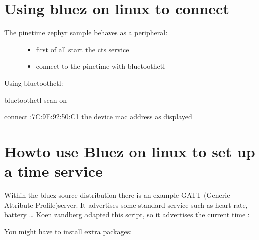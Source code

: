 \documentclass[letterpaper,10pt,english]{sphinxmanual}
\begin{document}
\section{Using bluez on linux to connect}
\label{\detokenize{current-time:using-bluez-on-linux-to-connect}}\begin{description}
\item[{The pinetime zephyr sample behaves as a peripheral:}] \leavevmode\begin{itemize}
\item {} 
first of all start the cts service

\item {} 
connect to the pinetime with bluetoothctl

\end{itemize}

\end{description}

Using bluetoothctl:

\begin{sphinxVerbatim}[commandchars=\\\{\}]
bluetoothctl
scan on


connect :7C:9E:92:50:C1 the device mac address as displayed
\end{sphinxVerbatim}


\section{Howto use Bluez on linux to set up a time service}
\label{\detokenize{current-time:howto-use-bluez-on-linux-to-set-up-a-time-service}}
Within the bluez source distribution there is an example GATT (Generic Attribute Profile)server. It advertises some standard service such as heart rate, battery …
Koen zandberg adapted this script, so it advertises the current time :

You might have to install extra packages:

\begin{sphinxVerbatim}[commandchars=\\\{\}]
\end{sphinxVerbatim}
\end{document}

